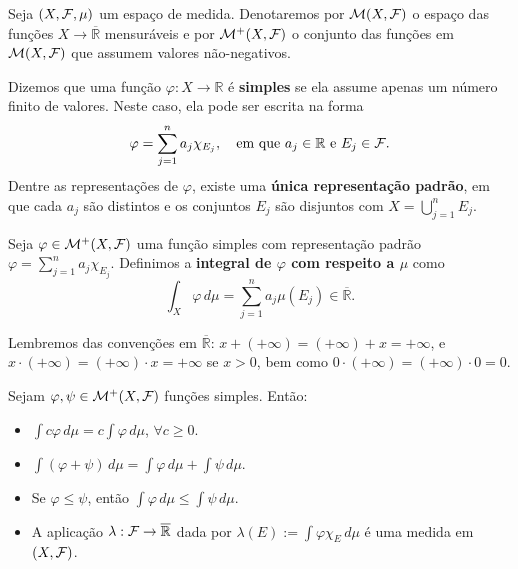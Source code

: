 
Seja $(X, \mathcal{F}, \mu)$ um espaço de medida. Denotaremos por $\mathcal{M}(X, \mathcal{F})$ o espaço das funções $X \rightarrow \overline{\mathbb{R}}$ mensuráveis e por $\mathcal{M}^+(X, \mathcal{F})$ o conjunto das funções em $\mathcal{M}(X, \mathcal{F})$ que assumem valores não-negativos.

\begin{definition*}{}
Dizemos que uma função $\varphi: X \rightarrow \mathbb{R}$ é \textbf{simples} se ela assume apenas um número finito de valores. Neste caso, ela pode ser escrita na forma
$$ \varphi = \sum_{j=1}^n a_j \chi_{E_j}, \quad \text{em que } a_j \in \mathbb{R} \text{ e } E_j \in \mathcal{F}. $$
Dentre as representações de $\varphi$, existe uma \textbf{única representação padrão}, em que cada $a_j$ são distintos e os conjuntos $E_j$ são disjuntos com $X = \bigcup_{j=1}^n E_j$.
\end{definition*}

\begin{definition*}{}
Seja $\varphi \in \mathcal{M}^+(X, \mathcal{F})$ uma função simples com representação padrão $\varphi = \sum_{j=1}^n a_j \chi_{E_j}$. Definimos a \textbf{integral de $\varphi$ com respeito a $\mu$} como
$$ \int_X \varphi \, d\mu = \sum_{j=1}^n a_j \mu(E_j) \in \overline{\mathbb{R}}. $$
\end{definition*}

Lembremos das convenções em $\overline{\mathbb{R}}$: $x + (+\infty) = (+\infty) + x = +\infty$, e $x \cdot (+\infty) = (+\infty) \cdot x = +\infty$ se $x > 0$, bem como $0 \cdot (+\infty) = (+\infty) \cdot 0 = 0$.

\begin{prop*}{}
Sejam $\varphi, \psi \in \mathcal{M}^+(X, \mathcal{F})$ funções simples. Então:
\begin{itemize}
    \item[a)] $\int c \varphi \, d\mu = c \int \varphi \, d\mu$, $\forall c \ge 0$.
    \item[b)] $\int (\varphi + \psi) \, d\mu = \int \varphi \, d\mu + \int \psi \, d\mu$.
    \item[c)] Se $\varphi \le \psi$, então $\int \varphi \, d\mu \le \int \psi \, d\mu$.
    \item[d)] A aplicação $\lambda: \mathcal{F} \rightarrow \overline{\mathbb{R}}$ dada por $\lambda(E) := \int \varphi \chi_E \, d\mu$ é uma medida em $(X, \mathcal{F})$.
\end{itemize}
\end{prop*}

